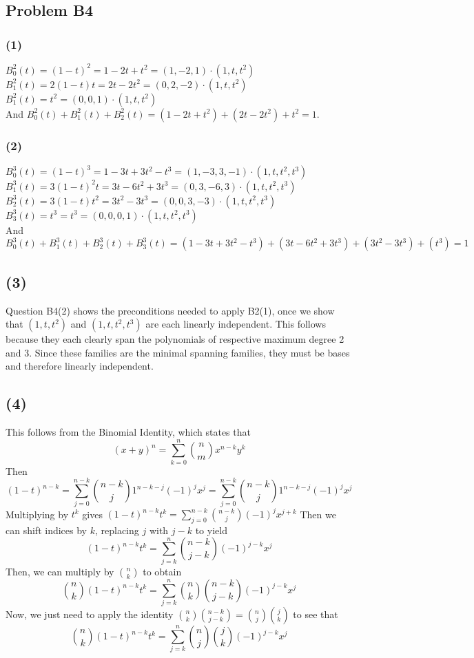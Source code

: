 \documentclass{article}
\begin{document}
\subsection{Problem B4}
\subsubsection{(1)}
$B^2_0(t) = (1-t)^2 = 1 - 2t + t^2 = (1,-2,1)\cdot(1, t, t^2)$\\
$B^2_1(t) = 2(1-t)t = 2t - 2t^2 = (0,2,-2)\cdot(1, t, t^2)$\\
$B^2_1(t) = t^2 = (0,0,1) \cdot(1,t,t^2)$\\
And $B^2_0(t) + B^2_1(t) + B^2_2(t) = (1 - 2t + t^2) + (2t - 2t^2) + t^2 = 1.$

\subsubsection{(2)}
$B^3_0(t) = (1-t)^3 = 1 - 3t + 3t^2 - t^3 = (1,-3,3,-1)\cdot(1, t, t^2,t^3)$\\
$B^3_1(t) = 3(1-t)^2t = 3t - 6t^2 + 3t^3 = (0,3,-6,3)\cdot(1, t, t^2,t^3)$\\
$B^3_2(t) = 3(1-t)t^2 = 3t^2 -3t^3 = (0,0,3,-3)\cdot(1, t, t^2,t^3)$\\
$B^3_3(t) = t^3 = t^3 = (0,0,0,1)\cdot(1, t, t^2,t^3)$\\
And $B^3_0(t) + B^3_1(t) + B^3_2(t) + B^3_3(t) = (1 - 3t + 3t^2 - t^3) + (3t -
6t^2 + 3t^3) + (3t^2 -3t^3) + (t^3) = 1$

\subsection{(3)}
Question B4(2) shows the preconditions needed to apply B2(1), once we show that
$(1,t,t^2)$ and $(1,t,t^2,t^3)$ are each linearly independent. This follows
because they each clearly span the polynomials of respective maximum degree 2
and 3. Since these families are the minimal spanning families, they must be
bases and therefore linearly independent.

\subsection{(4)}
This follows from the Binomial Identity, which states that
\[(x + y)^n = \sum_{k=0}^n \binom{n}{m}x^{n-k}y^k\]
Then 
\[(1-t)^{n-k} = \sum_{j=0}^{n-k}\binom{n-k}{j}1^{n-k-j}(-1)^jx^j =
\sum_{j=0}^{n-k}\binom{n-k}{j}1^{n-k-j}(-1)^jx^j \]
Multiplying by $t^k$ gives
$(1-t)^{n-k}t^k = \displaystyle{\sum_{j=0}^{n-k}
\binom{n-k}{j}(-1)^jx^{j+k}}$
Then we can shift indices by $k$, replacing $j$ with $j-k$ to yield
\[(1-t)^{n-k}t^k = \sum_{j=k}^{n} \binom{n-k}{j-k}(-1)^{j-k}x^j\]
Then, we can multiply by $\binom{n}{k}$ to obtain
\[\binom{n}{k}(1-t)^{n-k}t^k = \sum_{j=k}^{n} \binom{n}{k}\binom{n-k}{j-k}(-1)^{j-k}x^j\]
Now, we just need to apply the identity $\binom{n}{k}\binom{n-k}{j-k} =
\binom{n}{j}\binom{j}{k}$ to see that 
\[\binom{n}{k}(1-t)^{n-k}t^k = \sum_{j=k}^{n} \binom{n}{j}\binom{j}{k}(-1)^{j-k}x^j\]
\end{document}
